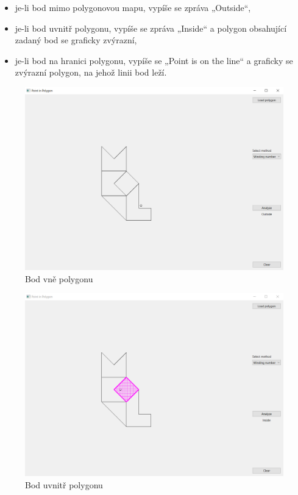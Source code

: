 \documentclass[11pt]{article}
\begin{document}
\begin{itemize}
\item je-li bod mimo polygonovou mapu, vypíše se zpráva „Outside“,
\item je-li bod uvnitř polygonu, vypíše se zpráva „Inside“ a polygon obsahující zadaný bod se graficky zvýrazní,
\item je-li bod na hranici polygonu, vypíše se „Point is on the line“ a graficky se zvýrazní polygon, na jehož linii bod leží.      
\end{itemize}
\begin{figure}[htbh]
	\centering
	\includegraphics[scale=0.4]{images/aplikace_analyze_outside.png} 
	\caption{Bod vně polygonu}
	\label{fig:app_outside}
\end{figure} 
\begin{figure}[htbh]
	\centering
	\includegraphics[scale=0.4]{images/aplikace_analyze_inside.png} 
	\caption{Bod uvnitř polygonu}
	\label{fig:app_inside}
\end{figure} 
\end{document}
